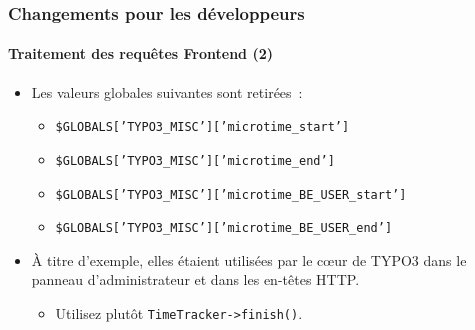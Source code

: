 \begin{frame}[fragile]
	\frametitle{Changements pour les développeurs}
	\framesubtitle{Traitement des requêtes Frontend (2)}

	\lstset{basicstyle=\smaller\ttfamily}

	\begin{itemize}
		\item Les valeurs globales suivantes sont retirées~:

			\begin{itemize}
				\item \texttt{\$GLOBALS['TYPO3\_MISC']['microtime\_start']}
				\item \texttt{\$GLOBALS['TYPO3\_MISC']['microtime\_end']}
				\item \texttt{\$GLOBALS['TYPO3\_MISC']['microtime\_BE\_USER\_start']}
				\item \texttt{\$GLOBALS['TYPO3\_MISC']['microtime\_BE\_USER\_end']}
			\end{itemize}

		\item À titre d'exemple, elles étaient utilisées par le cœur de TYPO3 dans le panneau d'administrateur
			et dans les en-têtes HTTP.

			\begin{itemize}\smaller
				\item[\ding{228}] Utilisez plutôt \texttt{TimeTracker->finish()}.
			\end{itemize}\normalsize

	\end{itemize}

\end{frame}



